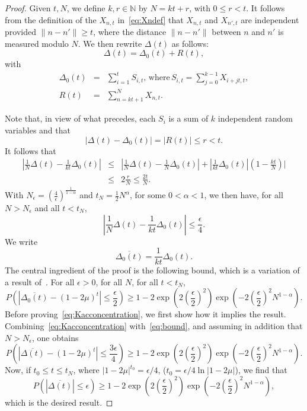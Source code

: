 \documentclass{article}
\newcommand {\N}{\mathbb{N}}
\numberwithin{equation}{section}
\begin{document}
\begin{proof}  Given $t,N$, we define $k,r\in\N$ by $N=kt+r$, with $0\leq r <t$. It follows from the definition of the $X_{n,t}$ in~\eqref{eq:Xndef} that $X_{n,t}$ and $X_{n', t}$ are independent provided $\|n-n'\|\geq t$, where the distance $\|n-n'\|$ between $n$ and $n'$ is measured modulo $N$. We  then rewrite $\Delta(t)$ as follows:
\begin{equation*}
\Delta(t)=\Delta_0(t)+R(t),
\end{equation*}
with
\begin{eqnarray*}
\Delta_0(t)&=&\sum_{i=1}^{t} S_{i,t},\, \mathrm{where}\, S_{i,t}=\sum_{j=0}^{k-1} X_{i+jt,t},\\
R(t)&=&\sum_{n=kt+1}^N X_{n,t}.
\end{eqnarray*}

Note that, in view of what precedes, each $S_i$ is a sum of $k$ independent random variables and that
\begin{equation}\label{eq:Rbound}
\mid \Delta(t)-\Delta_0(t)\mid=\mid R(t)\mid \leq r<t.
\end{equation}
It follows that
\begin{eqnarray}
|\frac1{N}\Delta(t)-\frac{1}{kt}\Delta_0(t)|&\leq& |\frac{1}{N}\Delta(t)-\frac1{N}\Delta_0(t)|+|\frac1{kt}\Delta_0(t)|(1-\frac{kt}{N})|\nonumber\\
&\leq& 2\frac{r}{N}\leq \frac{2t}{N}.\nonumber%
\end{eqnarray}
With $N_\epsilon=\left(\frac{4}{\epsilon}\right)^{\frac{1}{1-\alpha}}$ and $t_N=\frac12N^\alpha$, for some $0<\alpha<1$,
we then have, for all $N>N_\epsilon$ and all $t<t_N$,
\begin{equation}\label{eq:bound}
|\frac1{N}\Delta(t)-\frac{1}{kt}\Delta_0(t)|\leq \frac{\epsilon}{4}.
\end{equation}
We write
$$
\overline{\Delta_0(t)}=\frac{1}{kt}\Delta_0(t).
$$
The central ingredient of the proof is the following bound, which is a variation of a result of~\cite{Ho63}. For all $\epsilon>0$, for all $N$, for all $t<t_N$,
\begin{equation}\label{eq:Kacconcentration}
P(|\overline{\Delta_0(t)}-(1-2\mu)^t|\leq \frac{\epsilon}{2})\geq 1-2\exp(2(\frac{\epsilon}{2})^2)\exp(-2(\frac{\epsilon}{2})^2N^{1-\alpha}).
\end{equation}
Before proving~\eqref{eq:Kacconcentration}, we first show how it implies the result. Combining~\eqref{eq:Kacconcentration} with~\eqref{eq:bound}, and assuming in addition that $N>N_\epsilon$, one obtains
\begin{equation*}\label{eq:bound1}
P(|\overline{\Delta(t)}-(1-2\mu)^t|\leq \frac{3\epsilon}{4})\geq 1-2\exp(2(\frac{\epsilon}{2})^2)\exp(-2(\frac{\epsilon}{2})^2N^{1-\alpha}).
\end{equation*}
Now, if $t_0\leq t\leq t_N$, where $|1-2\mu|^{t_0}=\epsilon/4$, ($t_0=\epsilon/4\ln|1-2\mu|$), we find that
\begin{equation*}\label{eq:bound2}
P(|\overline{\Delta(t)}|\leq \epsilon)\geq 1-2\exp(2(\frac{\epsilon}{2})^2)\exp(-2(\frac{\epsilon}{2})^2N^{1-\alpha}),
\end{equation*}
which is the desired result.


\end{proof}
\end{document}
